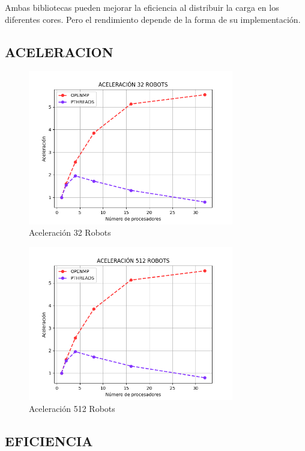 \documentclass[oneside,twocolumn]{article}
\begin{document}
Ambas bibliotecas pueden mejorar la eficiencia al distribuir la carga en los diferentes cores. Pero el rendimiento depende de la forma de su implementación.

\subsection{ACELERACION}

\begin{figure}[h]
    \centering
    \includegraphics[width=0.80\textwidth]{graficos/comparacion/aceleracion_32.png}
    \caption{Aceleración 32 Robots}
    \label{fig:secuencial}
\end{figure}

\begin{figure}[h]
    \centering
    \includegraphics[width=0.80\textwidth]{graficos/comparacion/aceleracion_512.png}
    \caption{Aceleración 512 Robots}
    \label{fig:secuencial}
\end{figure}

\newpage
\subsection{EFICIENCIA}
\end{document}
